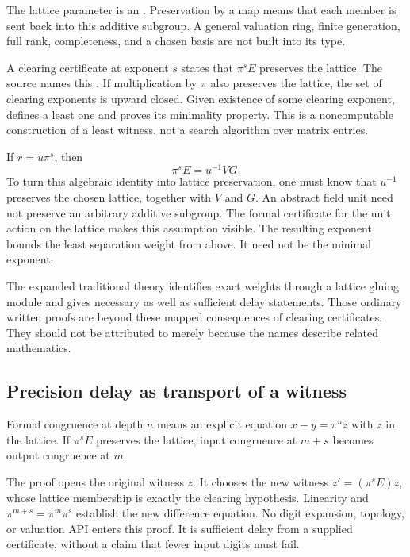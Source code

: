 The lattice parameter is an . Preservation by a map means that each member is sent back into this additive subgroup. A general valuation ring, finite generation, full rank, completeness, and a chosen basis are not built into its type.

A clearing certificate at exponent $s$ states that $\pi^sE$ preserves the lattice. The source names this . If multiplication by $\pi$ also preserves the lattice, the set of clearing exponents is upward closed. Given existence of some clearing exponent,  defines a least one and proves its minimality property. This is a noncomputable construction of a least witness, not a search algorithm over matrix entries.

If $r=u\pi^s$, then
\[
\pi^sE=u^{-1}VG.
\]
To turn this algebraic identity into lattice preservation, one must know that $u^{-1}$ preserves the chosen lattice, together with $V$ and $G$. An abstract field unit need not preserve an arbitrary additive subgroup. The formal certificate for the unit action on the lattice makes this assumption visible. The resulting exponent bounds the least separation weight from above. It need not be the minimal exponent.

The expanded traditional theory identifies exact weights through a lattice gluing module and gives necessary as well as sufficient delay statements. Those ordinary written proofs are beyond these mapped consequences of clearing certificates. They should not be attributed to  merely because the names describe related mathematics.

\subsection{Precision delay as transport of a witness}

Formal congruence at depth $n$ means an explicit equation $x-y=\pi^nz$ with $z$ in the lattice. If $\pi^sE$ preserves the lattice, input congruence at $m+s$ becomes output congruence at $m$.

The proof opens the original witness $z$. It chooses the new witness $z'=(\pi^sE)z$, whose lattice membership is exactly the clearing hypothesis. Linearity and $\pi^{m+s}=\pi^m\pi^s$ establish the new difference equation. No digit expansion, topology, or valuation API enters this proof. It is sufficient delay from a supplied certificate, without a claim that fewer input digits must fail.

